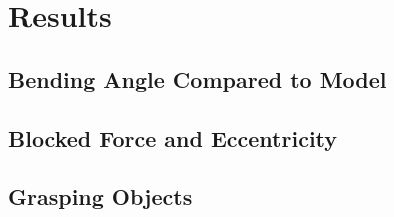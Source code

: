 \chapter{Results}
\section{Bending Angle Compared to Model}
\section{Blocked Force and Eccentricity}
\section{Grasping Objects}
